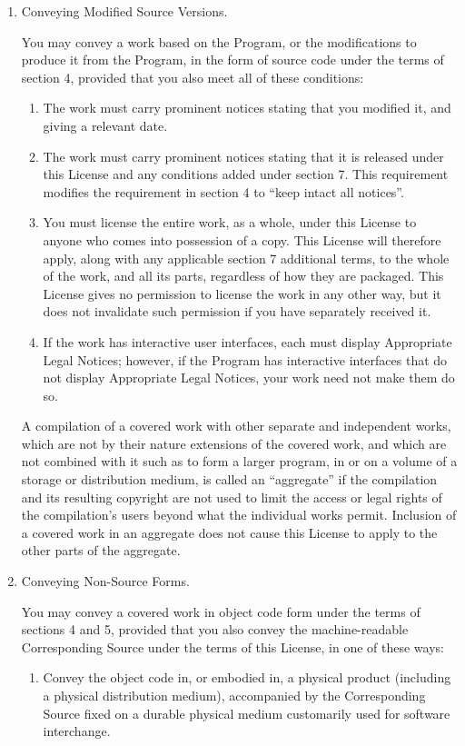\documentclass[11pt]{article}
\begin{document}
\begin{enumerate}
\item Conveying Modified Source Versions.

You may convey a work based on the Program, or the modifications to
produce it from the Program, in the form of source code under the
terms of section 4, provided that you also meet all of these conditions:
  \begin{enumerate}
  \item The work must carry prominent notices stating that you modified
  it, and giving a relevant date.

  \item The work must carry prominent notices stating that it is
  released under this License and any conditions added under section
  7.  This requirement modifies the requirement in section 4 to
  ``keep intact all notices''.

  \item You must license the entire work, as a whole, under this
  License to anyone who comes into possession of a copy.  This
  License will therefore apply, along with any applicable section 7
  additional terms, to the whole of the work, and all its parts,
  regardless of how they are packaged.  This License gives no
  permission to license the work in any other way, but it does not
  invalidate such permission if you have separately received it.

  \item If the work has interactive user interfaces, each must display
  Appropriate Legal Notices; however, if the Program has interactive
  interfaces that do not display Appropriate Legal Notices, your
  work need not make them do so.
\end{enumerate}
A compilation of a covered work with other separate and independent
works, which are not by their nature extensions of the covered work,
and which are not combined with it such as to form a larger program,
in or on a volume of a storage or distribution medium, is called an
``aggregate'' if the compilation and its resulting copyright are not
used to limit the access or legal rights of the compilation's users
beyond what the individual works permit.  Inclusion of a covered work
in an aggregate does not cause this License to apply to the other
parts of the aggregate.

\item Conveying Non-Source Forms.

You may convey a covered work in object code form under the terms
of sections 4 and 5, provided that you also convey the
machine-readable Corresponding Source under the terms of this License,
in one of these ways:
  \begin{enumerate}
  \item Convey the object code in, or embodied in, a physical product
  (including a physical distribution medium), accompanied by the
  Corresponding Source fixed on a durable physical medium
  customarily used for software interchange.


\end{enumerate}
\end{enumerate}
\end{document}
